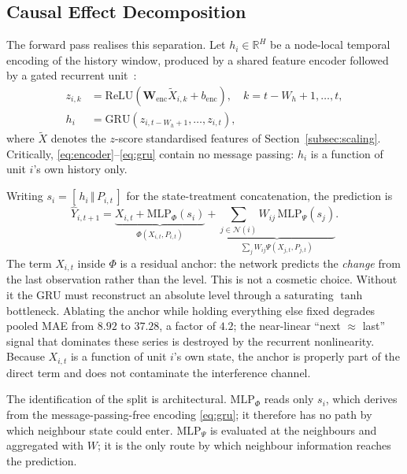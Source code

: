 \subsection{Causal Effect Decomposition}

The \CGCEN{} forward pass realises this separation. Let $h_i \in
\mathbb{R}^{H}$ be a node-local temporal encoding of the history window,
produced by a shared feature encoder followed by a gated recurrent
unit~\cite{cho2014gru}:
\begin{align}
  z_{i,k} &= \mathrm{ReLU}\!\left( \mathbf{W}_{\mathrm{enc}} \tilde{X}_{i,k}
             + b_{\mathrm{enc}} \right),
             \quad k = t - W_h + 1, \dots, t, \label{eq:encoder}\\
  h_i     &= \mathrm{GRU}\!\left( z_{i,t-W_h+1}, \dots, z_{i,t} \right),
             \label{eq:gru}
\end{align}
where $\tilde{X}$ denotes the $z$-score standardised features of
Section~\ref{subsec:scaling}. Critically, \eqref{eq:encoder}--\eqref{eq:gru}
contain no message passing: $h_i$ is a function of unit $i$'s own history only.

Writing $s_i = [\, h_i \,\Vert\, P_{i,t} \,]$ for the state-treatment
concatenation, the prediction is
\begin{equation}
  \hat{Y}_{i,t+1}
  = \underbrace{X_{i,t} + \mathrm{MLP}_{\Phi}(s_i)}_{\Phi(X_{i,t}, P_{i,t})}
  + \underbrace{\sum_{j \in \mathcal{N}(i)} W_{ij} \,
    \mathrm{MLP}_{\Psi}(s_j)}_{\sum_j W_{ij} \Psi(X_{j,t}, P_{j,t})} .
  \label{eq:decomposition}
\end{equation}
The term $X_{i,t}$ inside $\Phi$ is a residual anchor: the network predicts the
\emph{change} from the last observation rather than the level. This is not a
cosmetic choice. Without it the GRU must reconstruct an absolute level through a
saturating $\tanh$ bottleneck. Ablating the anchor while holding everything else
fixed degrades pooled MAE from $8.92$ to $37.28$, a factor of $4.2$; the
near-linear ``next $\approx$ last'' signal that dominates these series is
destroyed by the recurrent nonlinearity. Because
$X_{i,t}$ is a function of unit $i$'s own state, the anchor is properly part of
the direct term and does not contaminate the interference channel.

The identification of the split is architectural. $\mathrm{MLP}_{\Phi}$ reads
only $s_i$, which derives from the message-passing-free encoding
\eqref{eq:gru}; it therefore has no path by which neighbour state could enter.
$\mathrm{MLP}_{\Psi}$ is evaluated at the neighbours and aggregated with $W$;
it is the only route by which neighbour information reaches the prediction.

